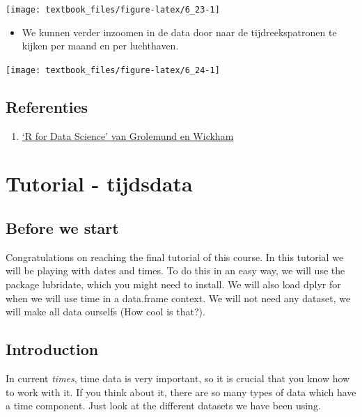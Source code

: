 \documentclass[]{tufte-book}
\providecommand{\tightlist}{%
  \setlength{\itemsep}{0pt}\setlength{\parskip}{0pt}}
\begin{document}
\texttt{[image: textbook\_files/figure-latex/6\_23-1]}

\begin{itemize}
\tightlist
\item
  We kunnen verder inzoomen in de data door naar de tijdreekspatronen te kijken per maand en per luchthaven.
\end{itemize}

\texttt{[image: textbook\_files/figure-latex/6\_24-1]}

\hypertarget{referenties-5}{%
\section{Referenties}\label{referenties-5}}

\begin{enumerate}
\def\labelenumi{\arabic{enumi}.}
\tightlist
\item
  \href{http://r4ds.had.co.nz/}{`R for Data Science' van Grolemund en Wickham}
\end{enumerate}

\hypertarget{tutorial---tijdsdata}{%
\chapter{Tutorial - tijdsdata}\label{tutorial---tijdsdata}}

\hypertarget{before-we-start}{%
\section{Before we start}\label{before-we-start}}

Congratulations on reaching the final tutorial of this course. In this tutorial we will be playing with dates and times. To do this in an easy way, we will use the package lubridate, which you might need to install. We will also load dplyr for when we will use time in a data.frame context. We will not need any dataset, we will make all data ourselfs (How cool is that?).

\hypertarget{introduction-1}{%
\section{Introduction}\label{introduction-1}}

In current \emph{times}, time data is very important, so it is crucial that you know how to work with it. If you think about it, there are so many types of data which have a time component. Just look at the different datasets we have been using.
\end{document}

